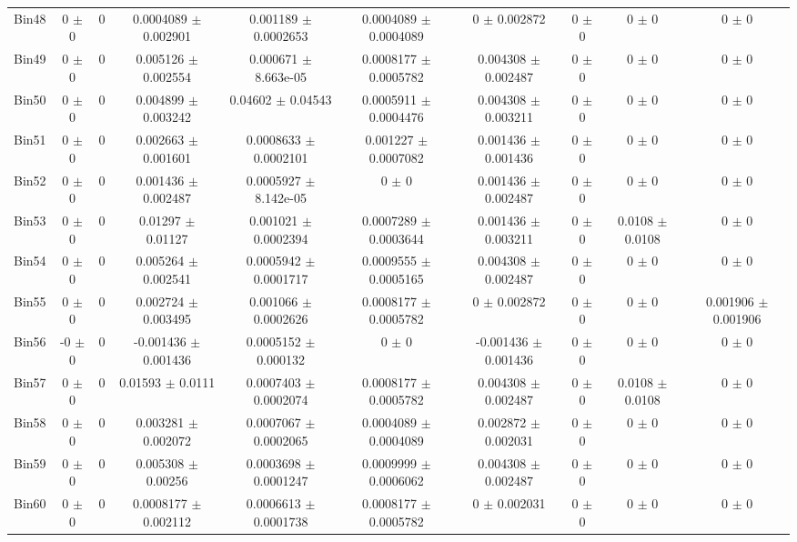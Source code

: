 \begin{tabular}{@{\extracolsep{4pt}}lccccccccc@{}}
     Bin48 & 0 $\pm$ 0 & 0 & 0.0004089 $\pm$ 0.002901 & 0.001189 $\pm$ 0.0002653 & 0.0004089 $\pm$ 0.0004089 & 0 $\pm$ 0.002872 & 0 $\pm$ 0 & 0 $\pm$ 0 & 0 $\pm$ 0 \\ 
     Bin49 & 0 $\pm$ 0 & 0 & 0.005126 $\pm$ 0.002554 & 0.000671 $\pm$ 8.663e-05 & 0.0008177 $\pm$ 0.0005782 & 0.004308 $\pm$ 0.002487 & 0 $\pm$ 0 & 0 $\pm$ 0 & 0 $\pm$ 0 \\ 
     Bin50 & 0 $\pm$ 0 & 0 & 0.004899 $\pm$ 0.003242 & 0.04602 $\pm$ 0.04543 & 0.0005911 $\pm$ 0.0004476 & 0.004308 $\pm$ 0.003211 & 0 $\pm$ 0 & 0 $\pm$ 0 & 0 $\pm$ 0 \\ 
     Bin51 & 0 $\pm$ 0 & 0 & 0.002663 $\pm$ 0.001601 & 0.0008633 $\pm$ 0.0002101 & 0.001227 $\pm$ 0.0007082 & 0.001436 $\pm$ 0.001436 & 0 $\pm$ 0 & 0 $\pm$ 0 & 0 $\pm$ 0 \\ 
     Bin52 & 0 $\pm$ 0 & 0 & 0.001436 $\pm$ 0.002487 & 0.0005927 $\pm$ 8.142e-05 & 0 $\pm$ 0 & 0.001436 $\pm$ 0.002487 & 0 $\pm$ 0 & 0 $\pm$ 0 & 0 $\pm$ 0 \\ 
     Bin53 & 0 $\pm$ 0 & 0 & 0.01297 $\pm$ 0.01127 & 0.001021 $\pm$ 0.0002394 & 0.0007289 $\pm$ 0.0003644 & 0.001436 $\pm$ 0.003211 & 0 $\pm$ 0 & 0.0108 $\pm$ 0.0108 & 0 $\pm$ 0 \\ 
     Bin54 & 0 $\pm$ 0 & 0 & 0.005264 $\pm$ 0.002541 & 0.0005942 $\pm$ 0.0001717 & 0.0009555 $\pm$ 0.0005165 & 0.004308 $\pm$ 0.002487 & 0 $\pm$ 0 & 0 $\pm$ 0 & 0 $\pm$ 0 \\ 
     Bin55 & 0 $\pm$ 0 & 0 & 0.002724 $\pm$ 0.003495 & 0.001066 $\pm$ 0.0002626 & 0.0008177 $\pm$ 0.0005782 & 0 $\pm$ 0.002872 & 0 $\pm$ 0 & 0 $\pm$ 0 & 0.001906 $\pm$ 0.001906 \\ 
     Bin56 & -0 $\pm$ 0 & 0 & -0.001436 $\pm$ 0.001436 & 0.0005152 $\pm$ 0.000132 & 0 $\pm$ 0 & -0.001436 $\pm$ 0.001436 & 0 $\pm$ 0 & 0 $\pm$ 0 & 0 $\pm$ 0 \\ 
     Bin57 & 0 $\pm$ 0 & 0 & 0.01593 $\pm$ 0.0111 & 0.0007403 $\pm$ 0.0002074 & 0.0008177 $\pm$ 0.0005782 & 0.004308 $\pm$ 0.002487 & 0 $\pm$ 0 & 0.0108 $\pm$ 0.0108 & 0 $\pm$ 0 \\ 
     Bin58 & 0 $\pm$ 0 & 0 & 0.003281 $\pm$ 0.002072 & 0.0007067 $\pm$ 0.0002065 & 0.0004089 $\pm$ 0.0004089 & 0.002872 $\pm$ 0.002031 & 0 $\pm$ 0 & 0 $\pm$ 0 & 0 $\pm$ 0 \\ 
     Bin59 & 0 $\pm$ 0 & 0 & 0.005308 $\pm$ 0.00256 & 0.0003698 $\pm$ 0.0001247 & 0.0009999 $\pm$ 0.0006062 & 0.004308 $\pm$ 0.002487 & 0 $\pm$ 0 & 0 $\pm$ 0 & 0 $\pm$ 0 \\ 
     Bin60 & 0 $\pm$ 0 & 0 & 0.0008177 $\pm$ 0.002112 & 0.0006613 $\pm$ 0.0001738 & 0.0008177 $\pm$ 0.0005782 & 0 $\pm$ 0.002031 & 0 $\pm$ 0 & 0 $\pm$ 0 & 0 $\pm$ 0 \\ 
\hline\hline
  \end{tabular}

